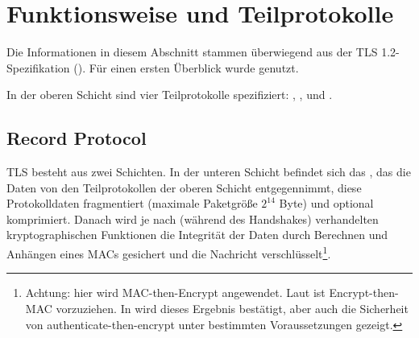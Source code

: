 \chapter{Funktionsweise und Teilprotokolle}


\lstset{style=pdu}

Die Informationen in diesem Abschnitt stammen überwiegend aus der TLS 1.2-Spezifikation (\cite{tls12}). Für einen ersten Überblick wurde \cite{eckert13} genutzt.

In der oberen Schicht sind vier Teilprotokolle spezifiziert: \handshakeprotocol{}, \changecipherspecprotocol{}, \alertprotocol{} und \applicationdataprotocol{}.











\section{Record Protocol}
TLS besteht aus zwei Schichten. In der unteren Schicht befindet sich das \recordprotocol{}, das die Daten von den Teilprotokollen der oberen Schicht entgegennimmt, diese Protokolldaten fragmentiert (maximale Paketgröße \(2^{14}\) Byte) und optional komprimiert. Danach wird je nach (während des Handshakes) verhandelten kryptographischen Funktionen die Integrität der Daten durch Berechnen und Anhängen eines MACs gesichert und die Nachricht verschlüsselt\footnote{Achtung: hier wird MAC-then-Encrypt angewendet. Laut \cite{AE2000} ist Encrypt-then-MAC vorzuziehen. In \cite{krawczyk01} wird dieses Ergebnis bestätigt, aber auch die Sicherheit von authenticate-then-encrypt unter bestimmten Voraussetzungen gezeigt.}. 



